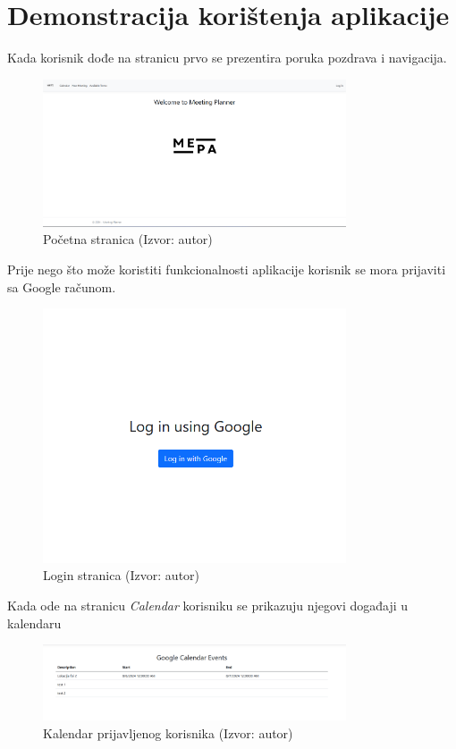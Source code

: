 \documentclass{foi}
\begin{document}
\chapter{Demonstracija korištenja aplikacije}
Kada korisnik dođe na stranicu prvo se prezentira poruka pozdrava i navigacija.
\begin{figure}[H]
    \centering
    \includegraphics[width=0.8\textwidth]{slike/appUsage1.png}
    \caption{Početna stranica (Izvor: autor)}
    \label{fig:startPageUI}
\end{figure}
Prije nego što može koristiti funkcionalnosti aplikacije korisnik se mora prijaviti sa Google računom.
\begin{figure}[H]
    \centering
    \includegraphics[width=0.8\textwidth]{slike/appUsage2.png}
    \caption{Login stranica (Izvor: autor)}
    \label{fig:loginUI}
\end{figure}
Kada ode na stranicu \textit{Calendar} korisniku se prikazuju njegovi događaji u kalendaru
\begin{figure}[H]
    \centering
    \includegraphics[width=0.8\textwidth]{slike/appUsage3.png}
    \caption{Kalendar prijavljenog korisnika (Izvor: autor)}
    \label{fig:userCalendarUI}
\end{figure}
\end{document}
